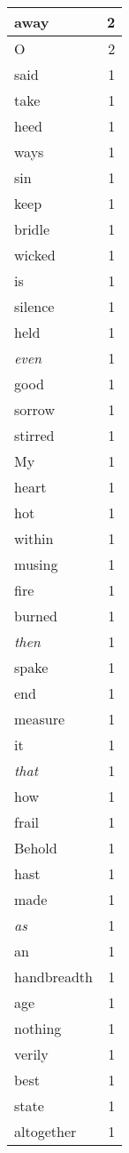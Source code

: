 \begin{center}
\begin{longtable}{l|r}
away & 2 \\ \hline
O & 2 \\ \hline
said & 1 \\ \hline
take & 1 \\ \hline
heed & 1 \\ \hline
ways & 1 \\ \hline
sin & 1 \\ \hline
keep & 1 \\ \hline
bridle & 1 \\ \hline
wicked & 1 \\ \hline
is & 1 \\ \hline
silence & 1 \\ \hline
held & 1 \\ \hline
\emph{even} & 1 \\ \hline
good & 1 \\ \hline
sorrow & 1 \\ \hline
stirred & 1 \\ \hline
My & 1 \\ \hline
heart & 1 \\ \hline
hot & 1 \\ \hline
within & 1 \\ \hline
musing & 1 \\ \hline
fire & 1 \\ \hline
burned & 1 \\ \hline
\emph{then} & 1 \\ \hline
spake & 1 \\ \hline
end & 1 \\ \hline
measure & 1 \\ \hline
it & 1 \\ \hline
\emph{that} & 1 \\ \hline
how & 1 \\ \hline
frail & 1 \\ \hline
Behold & 1 \\ \hline
hast & 1 \\ \hline
made & 1 \\ \hline
\emph{as} & 1 \\ \hline
an & 1 \\ \hline
handbreadth & 1 \\ \hline
age & 1 \\ \hline
nothing & 1 \\ \hline
verily & 1 \\ \hline
best & 1 \\ \hline
state & 1 \\ \hline
altogether & 1 \\ \hline

\end{longtable}
\end{center}
